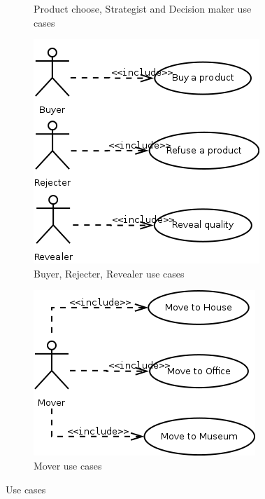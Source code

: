 \documentclass[a4paper,11pt]{report}
\begin{document}
\begin{figure}[ht!]
\begin{subfigure}{0.5\textwidth}
       \caption{Product choose, Strategist and Decision maker use cases}
       \label{figure:use_cases_2}
    \end{subfigure}
    
    \begin{subfigure}{0.5\textwidth}
       \centering
       \includegraphics[width=\textwidth]{media/use_cases_3.png}
       \caption{Buyer, Rejecter, Revealer use cases}
       \label{figure:use_cases_3}
    \end{subfigure}
    \begin{subfigure}{0.5\textwidth}
       \centering
       \includegraphics[width=\textwidth]{media/use_cases_4.png}
       \caption{Mover use cases}
       \label{figure:use_cases_4}
    \end{subfigure}

    \caption{Use cases}
    \label{figure:use_cases}
  \end{figure}
\end{document}
